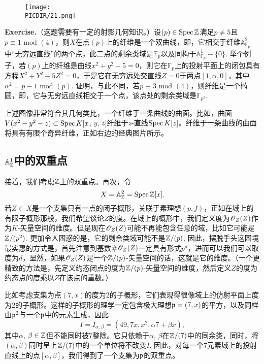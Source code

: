 \begin{wrapfigure}{r}{160pt}\texttt{[image: \\PICDIR/21.png]}\end{wrapfigure}
\noindent\textbf{Exercise\hspace{0.38em}{\addtocounter{thm}{1}}\thethm.}（这题需要有一定的射影几何知识。）设$(p)\in\operatorname{Spec}\mathbb{Z}$满足$p\neq 5$且$p\equiv 1\text{ mod } (4)$，则$X$在点$(p)$上的纤维是一个双曲线，即，它相交于纤维$\mathbb{A}_{\mathbb{F}_p}^2$中“无穷远直线”的两个点，此二点的剩余类域是$\mathbb{F}_p$以及同构于$\mathbb{A}_{\mathbb{F}_p}^1-\{0\}$. 举个例子，若$(p)$上的纤维是曲线$x^2+y^2-5=0$，则它在$\mathbb{F}_p$上的投射平面上的闭包具有方程$X^2+Y^2-5Z^2=0$，于是它在无穷远处交直线$Z=0$于两点$[1,\alpha,0]$，其中$\alpha^2=p-1\text{ mod } (p)$. 证明，与此不同，若$p\equiv 3\text{ mod } (4)$，则纤维是一个椭圆，即，它与无穷远直线相交于一个点，该点处的剩余类域是$\mathbb{F}_{p^2}$. \vspace{0.5em}

上述图像非常符合其几何类比，一个纤维于一条曲线的曲面。比如，曲面$V(x^2-y^2-z)\subset \operatorname{Spec} K[x$, $y$, $z]$纤维于$z$-直线$\operatorname{Spec} K[z]$。纤维于一条曲线的曲面将具有有限个奇异纤维，正如右边的经典图片所示。

\subsection{\texorpdfstring{$\mathbb{A}_{\mathbb{Z}}^1$}{A_Z^1}中的双重点}

接着，我们考虑$\mathbb{Z}$上的双重点。再次，令
\[
	X=\mathbb{A}_{\mathbb{Z}}^2=\operatorname{Spec}\mathbb{Z}[x].
\]
若$Z\subset X$是一个支集只有一点的闭子概形，关联于素理想$(p,f)$，正如在域上的有限子概形那般，我们希望谈论$Z$的度。在域上的概形中，我们定义度为$\mathscr{O}_Z(Z)$作为$K$\hyp 矢量空间的维度。但是现在$\mathscr{O}_Z(Z)$可能不再能包含任意的域，比如它可能是$\mathbb{Z}/(p^2)$. 更加令人困惑的是，它的剩余类域可能不是$\mathbb{Z}/(p)$. 因此，摆脱手头这困境最实惠的方式是，首先注意到基数$\# \mathscr{O}_Z(Z)$一定具有形式$p^d$，进而可以我们可以取度为$d$，显然，如果$\mathscr{O}_Z(Z)$是一个$\mathbb{Z}/(p)$\hyp 矢量空间的话，这就是它的维度。（一个更精致的方法是，先定义约态闭点的度为$\mathbb{Z}/(p)$\hyp 矢量空间的维度，然后定义$Z$的度为约态点的度乘以$Z$在该点的重数。）

比如考虑支集为点$(7,x)$的度为$2$的子概形，它们表现得很像域上的仿射平面上度为$2$的子概形。这样的子概形的理学一定包含极大理想$\mathfrak{p}=(7,x)$的平方，以及同样由$\mathfrak{p}^2$与一个$\mathfrak{p}$中的元素生成，因此
\[
	I=I_{\alpha,\beta}=(49,7x,x^2,\alpha 7+\beta x),
\]
其中$\alpha$, $\beta\in\mathbb{Z}$但不能同时被$7$整除。它只依赖于$\alpha$, $\beta$在$\mathbb{Z}/(7)$中的同余类，同时，将$(\alpha,\beta)$同时呈上$\mathbb{Z}/(7)$中的一个单位将不改变$I$. 因此，对每一个$7$元素域上的投射直线上的点$[\alpha,\beta]$，我们得到了一个支集为$\mathfrak{p}$的双重点。

